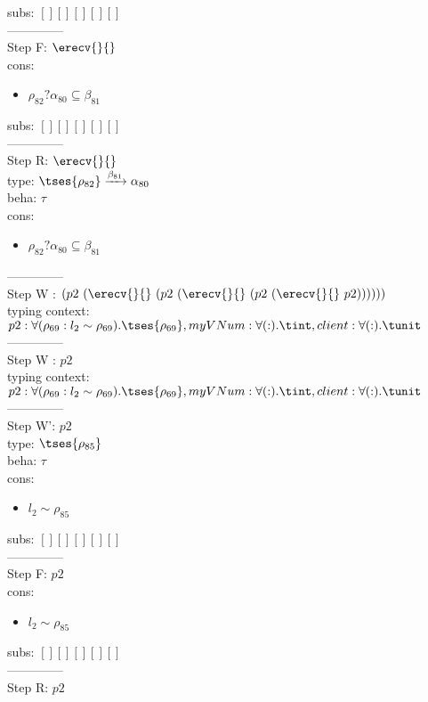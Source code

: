 \documentclass[12pt]{article}
\begin{document}
  subs:  $ [ ] [] [] [] [] $  
 \\--------------\\ 
Step F: $ \erecv{}{} $
 \\ cons: \begin{itemize}
\item $ \rho_{82}?\alpha_{80} \subseteq \beta_{81} $
\end{itemize}
 subs:  $ [ ] [] [] [] [] $ 
  \\--------------\\ 
Step R: $ \erecv{}{} $\\
  type: $  \tses{ \rho_{82}} \xrightarrow{\beta_{81}} \alpha_{80} $ 
\\  beha: $ \tau $ 
\\  cons: \begin{itemize}
\item $ \rho_{82}?\alpha_{80} \subseteq \beta_{81} $
\end{itemize} 
  --------------\\ 
Step W : $ (p2~(\erecv{}{}~(p2~(\erecv{}{}~(p2~(\erecv{}{}~p2)))))) $\\
 typing context: $ p2:\forall (\rho_{69} : l_{2} \sim\rho_{69}).  \tses{ \rho_{69}}, myVNum:\forall ( : ). \tint, client:\forall ( : ). \tunit$ 
\\ --------------\\
Step W : $ p2 $\\
 typing context: $ p2:\forall (\rho_{69} : l_{2} \sim\rho_{69}).  \tses{ \rho_{69}}, myVNum:\forall ( : ). \tint, client:\forall ( : ). \tunit$ 
\\ --------------\\
Step W': $ p2 $\\
  type: $  \tses{ \rho_{85}} $ 
\\  beha: $ \tau $ 
\\  cons: \begin{itemize}
\item $ l_{2} \sim\rho_{85} $
\end{itemize} 
  subs:  $ [ ] [] [] [] [] $  
 \\--------------\\ 
Step F: $ p2 $
 \\ cons: \begin{itemize}
\item $ l_{2} \sim\rho_{85} $
\end{itemize}
 subs:  $ [ ] [] [] [] [] $ 
  \\--------------\\ 
Step R: $ p2 $\\
\end{document}
